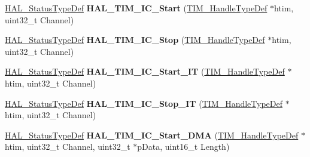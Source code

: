 \begin{DoxyCompactItemize}
\item 
\hypertarget{group___t_i_m___exported___functions___group4_gaab393018ca6f8fad04a815feb1796ce7}{\hyperlink{stm32l1xx__hal__def_8h_a63c0679d1cb8b8c684fbb0632743478f}{H\-A\-L\-\_\-\-Status\-Type\-Def} {\bfseries H\-A\-L\-\_\-\-T\-I\-M\-\_\-\-I\-C\-\_\-\-Start} (\hyperlink{struct_t_i_m___handle_type_def}{T\-I\-M\-\_\-\-Handle\-Type\-Def} $\ast$htim, uint32\-\_\-t Channel)}\label{group___t_i_m___exported___functions___group4_gaab393018ca6f8fad04a815feb1796ce7}

\item 
\hypertarget{group___t_i_m___exported___functions___group4_ga1b5edb103cb27dbd5380e9b24d12658f}{\hyperlink{stm32l1xx__hal__def_8h_a63c0679d1cb8b8c684fbb0632743478f}{H\-A\-L\-\_\-\-Status\-Type\-Def} {\bfseries H\-A\-L\-\_\-\-T\-I\-M\-\_\-\-I\-C\-\_\-\-Stop} (\hyperlink{struct_t_i_m___handle_type_def}{T\-I\-M\-\_\-\-Handle\-Type\-Def} $\ast$htim, uint32\-\_\-t Channel)}\label{group___t_i_m___exported___functions___group4_ga1b5edb103cb27dbd5380e9b24d12658f}

\item 
\hypertarget{group___t_i_m___exported___functions___group4_gac0e3515f374ec6b9d30609cd683649d6}{\hyperlink{stm32l1xx__hal__def_8h_a63c0679d1cb8b8c684fbb0632743478f}{H\-A\-L\-\_\-\-Status\-Type\-Def} {\bfseries H\-A\-L\-\_\-\-T\-I\-M\-\_\-\-I\-C\-\_\-\-Start\-\_\-\-I\-T} (\hyperlink{struct_t_i_m___handle_type_def}{T\-I\-M\-\_\-\-Handle\-Type\-Def} $\ast$htim, uint32\-\_\-t Channel)}\label{group___t_i_m___exported___functions___group4_gac0e3515f374ec6b9d30609cd683649d6}

\item 
\hypertarget{group___t_i_m___exported___functions___group4_gaf5664e207667c99ef50378813056e5f6}{\hyperlink{stm32l1xx__hal__def_8h_a63c0679d1cb8b8c684fbb0632743478f}{H\-A\-L\-\_\-\-Status\-Type\-Def} {\bfseries H\-A\-L\-\_\-\-T\-I\-M\-\_\-\-I\-C\-\_\-\-Stop\-\_\-\-I\-T} (\hyperlink{struct_t_i_m___handle_type_def}{T\-I\-M\-\_\-\-Handle\-Type\-Def} $\ast$htim, uint32\-\_\-t Channel)}\label{group___t_i_m___exported___functions___group4_gaf5664e207667c99ef50378813056e5f6}

\item 
\hypertarget{group___t_i_m___exported___functions___group4_gac3b7deffff43a8bdc3e2eea42115efff}{\hyperlink{stm32l1xx__hal__def_8h_a63c0679d1cb8b8c684fbb0632743478f}{H\-A\-L\-\_\-\-Status\-Type\-Def} {\bfseries H\-A\-L\-\_\-\-T\-I\-M\-\_\-\-I\-C\-\_\-\-Start\-\_\-\-D\-M\-A} (\hyperlink{struct_t_i_m___handle_type_def}{T\-I\-M\-\_\-\-Handle\-Type\-Def} $\ast$htim, uint32\-\_\-t Channel, uint32\-\_\-t $\ast$p\-Data, uint16\-\_\-t Length)}\label{group___t_i_m___exported___functions___group4_gac3b7deffff43a8bdc3e2eea42115efff}


\end{DoxyCompactItemize}
